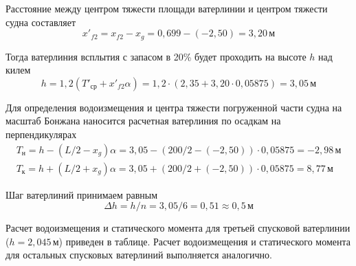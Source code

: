 Расстояние между центром тяжести площади ватерлинии и центром тяжести судна составляет
\begin{equation*}
    x'_{f2} = x_{f2} - x_g = 0{,}699 - (-2{,}50) = 3{,}20\,\text{м}
\end{equation*}

Тогда ватерлиния всплытия с запасом в 20\% будет проходить на высоте $h$ над килем
\begin{equation*}
    h = 1{,}2 (T'_{\text{ср}} + x'_{f2} \alpha) = 1{,}2 \cdot (2{,}35 + 3{,}20 \cdot 0{,}05875) = 3{,}05\,\text{м}
\end{equation*}

Для определения водоизмещения и центра тяжести погруженной части судна на масштаб Бонжана наносится расчетная ватерлиния по осадкам на перпендикулярах
\begin{equation*}
    \begin{split}
        T_{\text{н}} = h - (L/2 - x_g) \alpha = 3{,}05 - (200 / 2 - (-2{,}50)) \cdot 0{,}05875 = -2{,}98\,\text{м} \\
        T_{\text{к}} = h + (L/2 + x_g) \alpha = 3{,}05 + (200 / 2 + (-2{,}50)) \cdot 0{,}05875 = 8{,}77\,\text{м}
    \end{split}
\end{equation*}

Шаг ватерлиний принимаем равным
\begin{equation*}
    \Delta h = h / n = 3{,}05 / 6 = 0{,}51 \approx 0{,}5 \,\text{м}   
\end{equation*}

Расчет водоизмещения и статического момента для третьей спусковой ватерлинии ($h = 2{,}045\,\text{м}$) приведен в таблице.
Расчет водоизмещения и статического момента для остальных спусковых ватерлиний выполняется аналогично.

